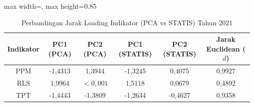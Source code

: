 \begin{table}[H]
\centering
\caption{Perbandingan Jarak Loading Indikator (PCA vs STATIS) Tahun 2021} \label{tab:sample1jarak_loading_2021}
\begin{adjustbox}{max width=\textwidth, max height=0.85\textheight}
\begin{tabular}{|c|c|c|c|c|c|}
\hline
\textbf{Indikator} & \textbf{PC1 (PCA)} & \textbf{PC2 (PCA)} & \textbf{PC1 (STATIS)} & \textbf{PC2 (STATIS)} & \textbf{Jarak Euclidean ($d$)} \\
\hline
PPM & -1,4313 & 1,3944 & -1,3245 & 0,4075 & 0,9927 \\
RLS & 1,9964 & $< 0,001$ & 1,5118 & 0,0679 & 0,4892 \\
TPT & -1,4443 & -1,3809 & -1,2634 & -0,4627 & 0,9358 \\
\hline
\end{tabular}
\end{adjustbox}
\end{table}